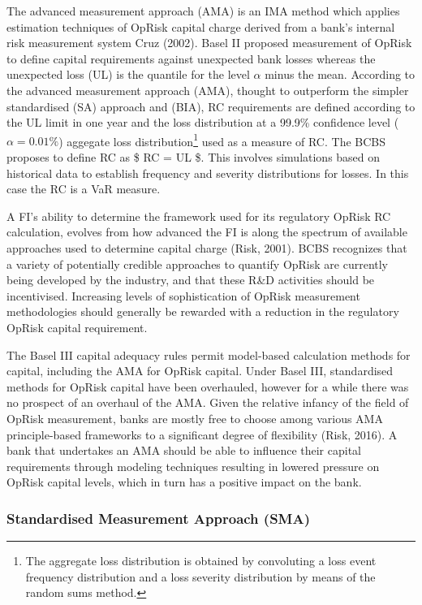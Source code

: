 \documentclass[]{DissertateUSU}
\let\rmarkdownfootnote\footnote%
\def\footnote{\protect\rmarkdownfootnote}
\begin{document}
The advanced measurement approach (AMA) is an IMA method which applies
estimation techniques of OpRisk capital charge derived from a bank's
internal risk measurement system Cruz (2002). Basel II proposed
measurement of OpRisk to define capital requirements against unexpected
bank losses whereas the unexpected loss (UL) is the quantile for the
level \(\alpha\) minus the mean. According to the advanced measurement
approach (AMA), thought to outperform the simpler standardised (SA)
approach and (BIA), RC requirements are defined according to the UL
limit in one year and the loss distribution at a 99.9\% confidence level
(\(\alpha = 0.01\%\)) aggegate loss
distribution\footnote{The aggregate loss distribution is obtained by convoluting a loss event frequency distribution and a loss severity distribution by means of the random sums method.}
used as a measure of RC. The BCBS proposes to define RC as \$ RC = UL
\$. This involves simulations based on historical data to establish
frequency and severity distributions for losses. In this case the RC is
a VaR measure.\medskip

A FI's ability to determine the framework used for its regulatory OpRisk
RC calculation, evolves from how advanced the FI is along the spectrum
of available approaches used to determine capital charge (Risk, 2001).
BCBS recognizes that a variety of potentially credible approaches to
quantify OpRisk are currently being developed by the industry, and that
these R\&D activities should be incentivised. Increasing levels of
sophistication of OpRisk measurement methodologies should generally be
rewarded with a reduction in the regulatory OpRisk capital
requirement.\medskip

The Basel III capital adequacy rules permit model-based calculation
methods for capital, including the AMA for OpRisk capital. Under Basel
III, standardised methods for OpRisk capital have been overhauled,
however for a while there was no prospect of an overhaul of the AMA.
Given the relative infancy of the field of OpRisk measurement, banks are
mostly free to choose among various AMA principle-based frameworks to a
significant degree of flexibility (Risk, 2016). A bank that undertakes
an AMA should be able to influence their capital requirements through
modeling techniques resulting in lowered pressure on OpRisk capital
levels, which in turn has a positive impact on the bank.\medskip 

\subsubsection{Standardised Measurement Approach (SMA)}
\end{document}
